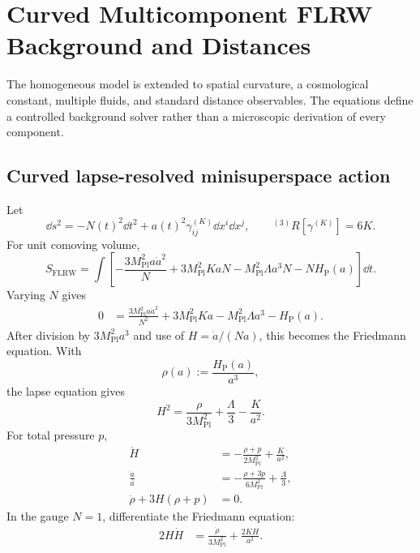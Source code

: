 \chapter{Curved Multicomponent FLRW Background and Distances}



The homogeneous model is extended to spatial curvature, a cosmological constant, multiple fluids, and standard distance observables.  The equations define a controlled background solver rather than a microscopic derivation of every component.

\allowdisplaybreaks

\section{Curved lapse-resolved minisuperspace action}
Let
\begin{equation}
\dd s^2=-N(t)^2\dd t^2+a(t)^2\gamma_{ij}^{(K)}\dd x^i\dd x^j,
\qquad
{}^{(3)}R[\gamma^{(K)}]=6K.
\end{equation}
For unit comoving volume,
\begin{equation}
S_{\mathrm{FLRW}}
=\int\left[
-\frac{3M_{\mathrm{Pl}}^2a\dot a^2}{N}
+3M_{\mathrm{Pl}}^2KaN
-M_{\mathrm{Pl}}^2\Lambda a^3N
-NH_{\mathrm P}(a)
\right]\dd t.
\end{equation}
Varying \(N\) gives
\begin{align}
0
&=
\frac{3M_{\mathrm{Pl}}^2a\dot a^2}{N^2}
+3M_{\mathrm{Pl}}^2Ka
-M_{\mathrm{Pl}}^2\Lambda a^3
-H_{\mathrm P}(a).
\end{align}
After division by \(3M_{\mathrm{Pl}}^2a^3\) and use of
\(H=\dot a/(Na)\), this becomes the Friedmann equation.
With
\begin{equation}
\rho(a):=\frac{H_{\mathrm P}(a)}{a^3},
\end{equation}
the lapse equation gives
\begin{equation}
\boxed{
H^2
=\frac{\rho}{3M_{\mathrm{Pl}}^2}
+\frac{\Lambda}{3}
-\frac{K}{a^2}.
}
\end{equation}
For total pressure \(p\),
\begin{align}
\dot H
&=-\frac{\rho+p}{2M_{\mathrm{Pl}}^2}+\frac{K}{a^2},\\
\frac{\ddot a}{a}
&=-\frac{\rho+3p}{6M_{\mathrm{Pl}}^2}+\frac{\Lambda}{3},\\
\dot\rho+3H(\rho+p)&=0.
\end{align}
In the gauge \(N=1\), differentiate the Friedmann equation:
\begin{align}
2H\dot H
&=
\frac{\dot\rho}{3M_{\mathrm{Pl}}^2}
+\frac{2KH}{a^2}.
\end{align}
